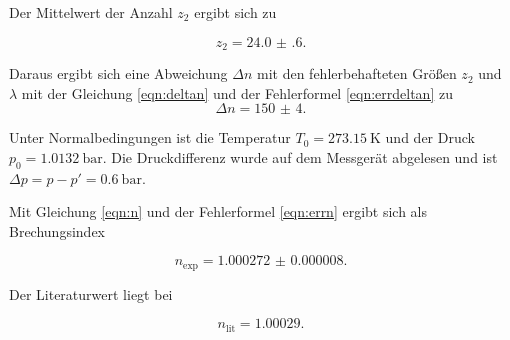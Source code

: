 

\noindent Der Mittelwert der Anzahl $z_2$ ergibt sich zu 

\begin{equation*}
    z_2 = \num{24.0(6)}.
\end{equation*}

\noindent Daraus ergibt sich eine Abweichung $\Delta n$ mit den fehlerbehafteten Größen $z_2$ und $\lambda$ mit der Gleichung \eqref{eqn:deltan} und der Fehlerformel \eqref{eqn:errdeltan} zu 
\begin{equation*}
    \Delta n = \num{150(4)}.
\end{equation*}

\noindent Unter Normalbedingungen ist die Temperatur $T_0 = \SI{273.15}{\kelvin}$ und der Druck $ p_0 = \SI{1.0132}{\bar}.$ Die Druckdifferenz wurde auf dem Messgerät abgelesen und ist $\Delta p = p - p' = \SI{0.6}{\bar}$.

\noindent Mit Gleichung \eqref{eqn:n} und der Fehlerformel \eqref{eqn:errn} ergibt sich als Brechungsindex

\begin{equation*}
    n_\text{exp} = \num{1.000272(8)}.
\end{equation*}

\noindent Der Literaturwert \cite{Luft} liegt bei

\begin{equation*}
    n_\text{lit} = \num{1.00029}.
\end{equation*}

